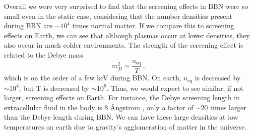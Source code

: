 Overall we were very surprised to find that the screening effects in BBN were so small even in the static case, considering that the number densities present during BBN are $\sim 10^4$ times normal matter. If we compare this to screening effects on Earth, we can see that although plasmas occur at lower densities, they also occur in much colder environments. The strength of the screening effect is related to the Debye mass
\begin{equation}
m_D^2 \sim \frac{n_\text{eq} }{T}\,,
\end{equation}
which is on the order of a few keV during BBN. On earth, $n_\text{eq}$ is decreased by $\sim 10^4$, but T is decreased by $\sim 10^6$. Thus, we would expect to see similar, if not larger, screening effects on Earth. For instance, the Debye screening length in extracellular fluid in the body is 8 \AA ngstrom \cite{Wennerstrom:2020}, only a factor of $\sim 20$ times larger than the Debye length during BBN. We can have these large densities at low temperatures on earth due to gravity's agglomeration of matter in the universe.

